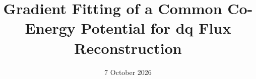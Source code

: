 \title{Gradient Fitting of a Common Co-Energy Potential for dq Flux Reconstruction}
\author{}
\date{7 October 2026}
\newcommand{\PaperAbstract}{Can inconsistent flux samples be represented by slopes of a common scalar potential? A differentiable symmetric B-spline potential gives a linear gradient fit with gauge fixing and a penalty on changing curvature. Integrability and reflection hold by construction. Controlled synthetic experiments distinguish flux accuracy, Hessian accuracy and exact structural guarantees. A portable real PSM demonstration compares independent, parity-only and potential fits on spatially withheld regions, with raw values and discarded residuals preserved. The real constrained fits incur larger prediction error against measured samples; enforced consistency is therefore a model restriction, not evidence of improved magnetic truth.}
\newif\ifshowglossary\showglossarytrue
\newif\ifshowbibliography\showbibliographytrue
